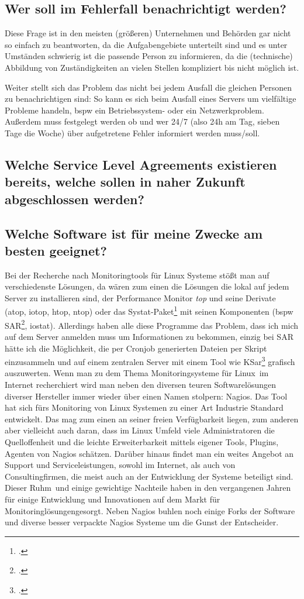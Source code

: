 \documentclass[12pt,a4paper,parskip]{scrreprt}
\begin{document}
	\subsection{Wer soll im Fehlerfall benachrichtigt werden?}
	Diese Frage ist in den meisten (größeren) Unternehmen und Behörden gar nicht so einfach zu beantworten, da die Aufgabengebiete unterteilt sind und es unter Umständen schwierig ist die passende Person zu informieren, da die (technische) Abbildung von Zuständigkeiten an vielen Stellen kompliziert bis nicht möglich ist. 
	
	Weiter stellt sich das Problem das nicht bei jedem Ausfall die gleichen Personen zu benachrichtigen sind:
	So kann es sich beim Ausfall eines Servers um vielfältige Probleme handeln, \acrlong{bspw} ein Betriebssystem- oder ein Netzwerkproblem.
	Außerdem muss festgelegt werden ob und wer 24/7 (also 24h am Tag, sieben Tage die Woche) über aufgetretene Fehler informiert werden muss/soll.
	\subsection{Welche Service Level Agreements existieren bereits, welche sollen in naher Zukunft abgeschlossen werden?}
	\subsection{Welche Software ist für meine Zwecke am besten geeignet?}
	Bei der Recherche nach Monitoringtools für Linux Systeme stößt man auf verschiedenste Lösungen, da wären zum einen die Lösungen die lokal auf jedem Server zu installieren sind, der Performance Monitor \textit{top} und seine Derivate (atop, iotop, htop, ntop) oder das Systat-Paket\footcite{sysstat} mit seinen Komponenten (\acrlong{bspw} SAR\footcite{sarkrenn}, iostat). Allerdings haben alle diese Programme das Problem, dass ich mich auf dem Server anmelden muss um Informationen zu bekommen, einzig bei SAR hätte ich die Möglichkeit, die per Cronjob generierten Dateien per Skript einzusammeln und auf einem zentralen Server mit einem Tool wie KSar\footcite{ksar} grafisch auszuwerten.
	Wenn man zu dem Thema \glqq Monitoringsysteme für Linux\grqq\ im Internet recherchiert wird man neben den diversen teuren Softwarelösungen diverser Hersteller immer wieder über einen Namen stolpern: Nagios. Das Tool hat sich fürs Monitoring von Linux Systemen zu einer Art Industrie Standard entwickelt. Das mag zum einen an seiner freien Verfügbarkeit liegen, zum anderen aber vielleicht auch daran, dass im Linux Umfeld viele Administratoren die Quelloffenheit und die leichte Erweiterbarkeit mittels eigener Tools, Plugins, Agenten von Nagios schätzen. Darüber hinaus findet man ein weites Angebot an Support und Serviceleistungen, sowohl im Internet, als auch von Consultingfirmen, die meist auch an der Entwicklung der Systeme beteiligt sind. Dieser \glqq Ruhm\grqq\ und einige gewichtige Nachteile haben in den vergangenen Jahren für einige Entwicklung und Innovationen auf dem \glqq Markt für Monitoringlösungen\grqq gesorgt. Neben Nagios buhlen noch einige Forks der Software und diverse besser verpackte Nagios Systeme um die Gunst der Entscheider.
	
\end{document}
